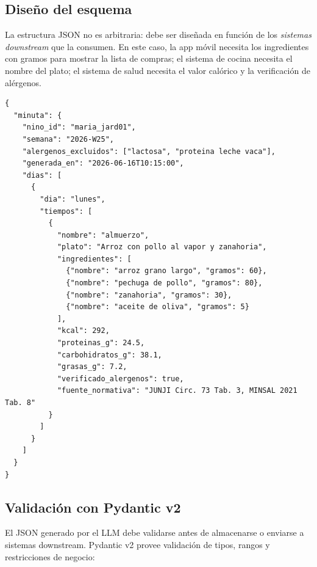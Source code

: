 \documentclass[12pt,a4paper]{article}
\begin{document}
\subsection{Diseño del esquema}

La estructura JSON no es arbitraria: debe ser diseñada en función de los
\textit{sistemas downstream} que la consumen. En este caso, la app móvil
necesita los ingredientes con gramos para mostrar la lista de compras;
el sistema de cocina necesita el nombre del plato; el sistema de salud
necesita el valor calórico y la verificación de alérgenos.

\begin{lstlisting}[style=jsonstyle, caption={Ejemplo de respuesta completa del sistema}, label={fig:json_esquema}]
{
  "minuta": {
    "nino_id": "maria_jard01",
    "semana": "2026-W25",
    "alergenos_excluidos": ["lactosa", "proteina leche vaca"],
    "generada_en": "2026-06-16T10:15:00",
    "dias": [
      {
        "dia": "lunes",
        "tiempos": [
          {
            "nombre": "almuerzo",
            "plato": "Arroz con pollo al vapor y zanahoria",
            "ingredientes": [
              {"nombre": "arroz grano largo", "gramos": 60},
              {"nombre": "pechuga de pollo", "gramos": 80},
              {"nombre": "zanahoria", "gramos": 30},
              {"nombre": "aceite de oliva", "gramos": 5}
            ],
            "kcal": 292,
            "proteinas_g": 24.5,
            "carbohidratos_g": 38.1,
            "grasas_g": 7.2,
            "verificado_alergenos": true,
            "fuente_normativa": "JUNJI Circ. 73 Tab. 3, MINSAL 2021 Tab. 8"
          }
        ]
      }
    ]
  }
}
\end{lstlisting}

\subsection{Validación con Pydantic v2}

El JSON generado por el LLM debe validarse antes de almacenarse o enviarse
a sistemas downstream. Pydantic v2 provee validación de tipos, rangos y
restricciones de negocio:
\end{document}
